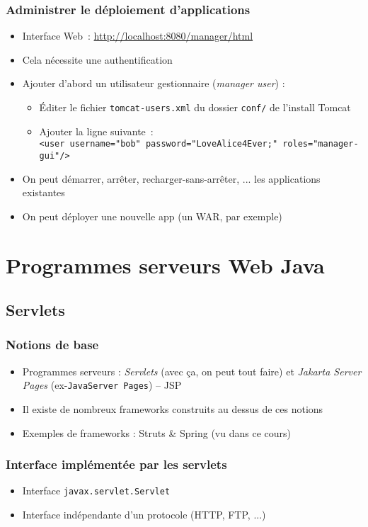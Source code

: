 \documentclass{beamer}
\begin{document}
\begin{frame}
  \frametitle{Administrer le déploiement d'applications}
  \begin{itemize}
  \item Interface Web~: \url{http://localhost:8080/manager/html}
  \item Cela nécessite une authentification
  \item Ajouter d'abord un utilisateur gestionnaire (\textit{manager user}) :
    \begin{itemize}
    \item Éditer le fichier \texttt{tomcat-users.xml} du dossier
      \texttt{conf/} de l'install Tomcat
    \item Ajouter la ligne suivante~:\\
      \texttt{<user username="bob" password="LoveAlice4Ever;" roles="manager-gui"/>}
    \end{itemize}
  \item On peut démarrer, arrêter, recharger-sans-arrêter, ... les
    applications existantes
  \item On peut déployer une nouvelle app (un WAR, par exemple)
  \end{itemize}
\end{frame}

\section{Programmes serveurs Web Java}

\subsection{Servlets}
\begin{frame}
  \frametitle{Notions de base}
  \begin{itemize}
  \item Programmes serveurs : \textit{Servlets} (avec ça, on peut tout faire) et \textit{Jakarta Server Pages} (ex-\texttt{JavaServer Pages}) -- JSP
  \item Il existe de nombreux frameworks construits au dessus de ces notions
  \item Exemples de frameworks : Struts \& Spring (vu dans ce cours)
  \end{itemize}
\end{frame}

\begin{frame}
  \frametitle{Interface implémentée par les servlets}
      \begin{itemize}
      \item Interface \texttt{javax.servlet.Servlet}
      \vspace{4.5cm}
    \item Interface indépendante d'un protocole (HTTP, FTP, ...)
      \end{itemize}
\end{frame}
\end{document}
